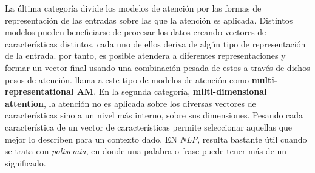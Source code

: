 La última categoría divide los modelos de atención por las formas de representación de las entradas
sobre las que la atención es aplicada. Distintos modelos pueden beneficiarse de procesar los datos
creando vectores de características distintos, cada uno de ellos deriva de algún tipo de representación
de la entrada. por tanto, es posible atendera a diferentes representaciones y formar un vector
final usando una combinación pesada de estos a través de dichos pesos de atención.
\citeauthor{DBLP:journals/corr/abs-1904-02874} llama a este tipo de modelos de atención como
\textbf{multi-representational AM}. En la segunda categoría,
\textbf{milti-dimensional attention}, la atención no es aplicada sobre los diversas vectores de
características sino a un nivel más interno,
sobre sus dimensiones. Pesando cada característica de un vector de características permite seleccionar
aquellas que mejor lo describen para un contexto dado. EN \textit{NLP}, resulta bastante útil cuando se trata
con \textit{polisemia}, en donde una palabra o frase puede tener más de un significado.
